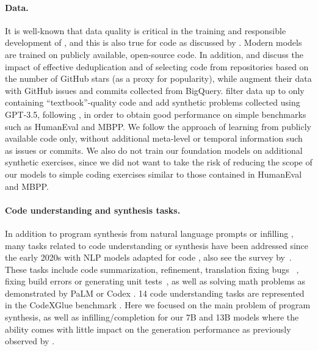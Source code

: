 \documentclass[10pt]{article}
\begin{document}
\paragraph{Data.} 
It is well-known that data quality is critical in the training and responsible development of \LLMs \citep[e.g.,][]{hoffmann2022training,penedo2023refinedweb}, and this is also true for code as discussed by \citet{allal2023santacoder}. Modern models are trained on publicly available, open-source code.
In addition, \citet{allamanis2019adverse} and \citet{allal2023santacoder} discuss the impact of effective deduplication and of selecting code from repositories based on the number of GitHub stars (as a proxy for popularity), while \citet{li2023starcoder} augment their data with GitHub issues and commits collected from BigQuery. \citet{gunasekar2023textbooks} filter data up to only containing ``textbook''-quality code and add synthetic problems collected using GPT-3.5, following \citet{jung2023impossible}, in order to obtain good performance on simple benchmarks such as HumanEval and MBPP. We follow the approach of learning from publicly available code only, without additional meta-level or temporal information such as issues or commits. We also do not train our foundation models on additional synthetic exercises, since we did not want to take the risk of reducing the scope of our models to simple coding exercises similar to those contained in HumanEval and MBPP.

\paragraph{Code understanding and synthesis tasks.} In addition to program synthesis from natural language prompts or infilling \citep{fried2022incoder,bavarian2022efficient,li2023starcoder,nguyen2023meet}, many tasks related to code understanding or synthesis have been addressed since the early 2020s with NLP models adapted for code \citep{raffel2020exploring,feng2020codebert,guo2020graphcodebert,wang2021codet5,ahmad2021unified}, also see the survey by~\citet{xu2022survey}. These tasks include code summarization, refinement, translation \citep{roziere2020unsupervised,DBLP:journals/corr/abs-2110-06773,szafraniec2022code} fixing bugs ~\citep{yasunaga2021break,zhang2022repairing,prenner2022can}, fixing build errors \citep{tarlow2020learning} or generating unit tests~\citep{tufano2020unit,li2022alphacode,chen2022codet}, as well as solving math problems as demonstrated by PaLM \citep{chowdhery2022palm} or Codex \citep{chen2021evaluating}. 14 code understanding tasks are represented in the CodeXGlue benchmark \citep{CodeXGLUE}. Here we focused on the main problem of program synthesis, as well as infilling/completion for our 7B and 13B models where the ability comes with little impact on the generation performance as previously observed by \citet{bavarian2022efficient}. 
\end{document}
